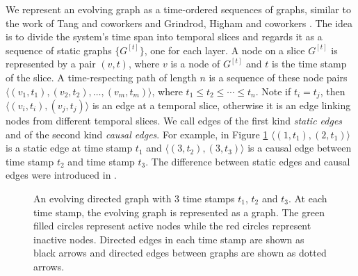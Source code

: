 \documentclass[12pt]{article}
\theoremstyle{definition}
\begin{document}
We represent an evolving graph as a time-ordered sequences of graphs, similar to the work of Tang and coworkers \cite{tang10, tang102, tang09, nicosia13} and Grindrod, Higham and coworkers \cite{grindrod11, grindrod13}. The idea is to divide the system's time span into temporal slices and regards it as a sequence of static graphs $\{G^{[t]}\}$, one for each layer. A node on a slice $G^{[t]}$ is represented by a pair $(v, t)$, where $v$ is a node of $G^{[t]}$ and $t$ is the time stamp of the slice. A time-respecting path of length $n$ is a sequence of these node pairs $\langle (v_1, t_1), (v_2, t_2), \ldots ,(v_m, t_m)\rangle$, where $t_1 \le t_2 \le \cdots \le t_n$. Note if $t_i = t_j$, then $\langle (v_i, t_i), (v_j, t_j) \rangle$ is an edge at a temporal slice,  otherwise it is an edge linking nodes from different temporal slices. 
We call edges of the first kind \emph{static edges} and of the second kind
\emph{causal edges}.
For example, in Figure \ref{fig:eg_shortest_path}
$\langle (1, t_1), (2, t_1) \rangle$ is a static edge at time stamp $t_1$ and $\langle (3, t_2), (3, t_3) \rangle$ is a causal edge between time stamp $t_2$ and time stamp $t_3$.
The difference between static edges and causal edges were introduced in \cite{chen16}.

\begin{figure}[h]
 \begin{center}
\end{center}
\caption{An evolving directed graph with 3 time stamps $t_1$, $t_2$ and $t_3$.
At each time stamp, the evolving graph is represented as a graph.
The green filled circles represent active nodes while the red circles represent
inactive nodes. Directed edges in each time stamp are shown as black arrows and directed edges between graphs are shown as dotted arrows.}
\label{fig:eg_shortest_path}
\end{figure}
\end{document}
